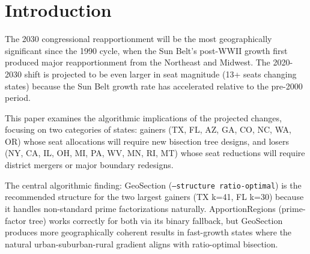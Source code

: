 \section{Introduction}

The 2030 congressional reapportionment will be the most geographically significant
since the 1990 cycle, when the Sun Belt's post-WWII growth first produced major
reapportionment from the Northeast and Midwest. The 2020-2030 shift is projected to
be even larger in seat magnitude (13+ seats changing states) because the Sun Belt
growth rate has accelerated relative to the pre-2000 period.

This paper examines the algorithmic implications of the projected changes,
focusing on two categories of states: gainers (TX, FL, AZ, GA, CO, NC, WA, OR)
whose seat allocations will require new bisection tree designs, and losers (NY, CA,
IL, OH, MI, PA, WV, MN, RI, MT) whose seat reductions will require district mergers
or major boundary redesigns.

The central algorithmic finding: GeoSection (\texttt{--structure ratio-optimal})
is the recommended structure for the two largest gainers (TX k=41, FL k=30) because
it handles non-standard prime factorizations naturally. ApportionRegions (prime-factor
tree) works correctly for both via its binary fallback, but GeoSection produces
more geographically coherent results in fast-growth states where the natural
urban-suburban-rural gradient aligns with ratio-optimal bisection.
